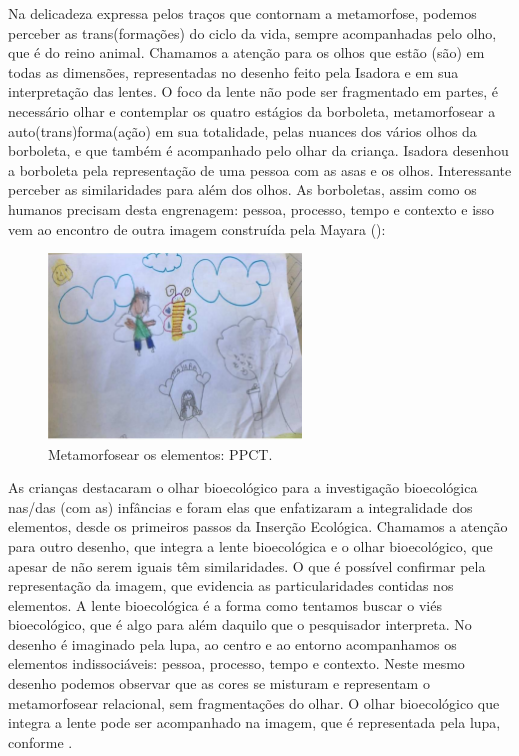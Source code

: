 \documentclass{textolivre}
\begin{document}
Na delicadeza expressa pelos traços que contornam a metamorfose, podemos perceber as trans(formações) do ciclo da vida, sempre acompanhadas pelo olho, que é do reino animal. Chamamos a atenção para os olhos que estão (são) em todas as dimensões, representadas no desenho feito pela Isadora e em sua interpretação das lentes. O foco da lente não pode ser fragmentado em partes, é necessário olhar e contemplar os quatro estágios da borboleta, metamorfosear a auto(trans)forma(ação) em sua totalidade, pelas nuances dos vários olhos da borboleta, e que também é acompanhado pelo olhar da criança. Isadora desenhou a borboleta pela representação de uma pessoa com as asas e os olhos. Interessante perceber as similaridades para além dos olhos. As borboletas, assim como os humanos precisam desta engrenagem: pessoa, processo, tempo e contexto e isso vem ao encontro de outra imagem construída pela Mayara (): 

\begin{figure}[h!]
 \centering
 \includegraphics[width=0.6\textwidth]{figure04.pdf}
 \caption{Metamorfosear os elementos: PPCT.}
 \label{fig-fig04}
\end{figure}

As crianças destacaram o olhar bioecológico para a investigação bioecológica nas/das (com as) infâncias e foram elas que enfatizaram a integralidade dos elementos, desde os primeiros passos da Inserção Ecológica. Chamamos a atenção para outro desenho, que integra a lente bioecológica e o olhar bioecológico, que apesar de não serem iguais têm similaridades. O que é possível confirmar pela representação da imagem, que evidencia as particularidades contidas nos elementos. A lente bioecológica é a forma como tentamos buscar o viés bioecológico, que é algo para além daquilo que o pesquisador interpreta. No desenho é imaginado pela lupa, ao centro e ao entorno acompanhamos os elementos indissociáveis: pessoa, processo, tempo e contexto. Neste mesmo desenho podemos observar que as cores se misturam e representam o metamorfosear relacional, sem fragmentações do olhar. O olhar bioecológico que integra a lente pode ser acompanhado na imagem, que é representada pela lupa, conforme . 
\end{document}
